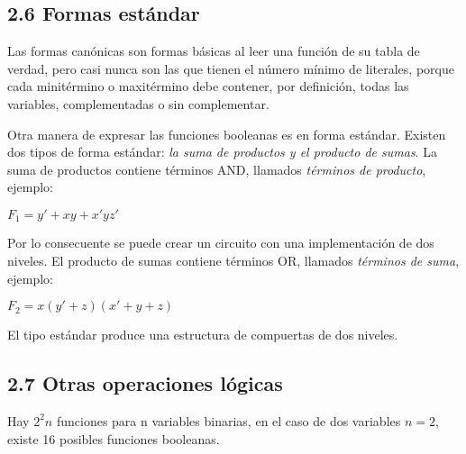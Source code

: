 \subsection*{2.6 Formas est\'{a}ndar}
Las formas can\'{o}nicas son formas b\'{a}sicas al leer una funci\'{o}n de su tabla
de verdad, pero casi nunca son las que tienen el n\'{u}mero m\'{i}nimo de literales,
porque cada minit\'{e}rmino o maxit\'{e}rmino debe contener, por definici\'{o}n, todas las
variables, complementadas o sin complementar.

Otra manera de expresar las funciones booleanas es en forma est\'{a}ndar.
Existen dos tipos de forma est\'{a}ndar:
\textit{la suma de productos y el producto de sumas}. La suma de productos contiene
t\'{e}rminos AND, llamados \textit{t\'{e}rminos de producto}, ejemplo:
\begin{center}
    $F_1 = y' + xy + x'yz'$
\end{center}
Por lo consecuente se puede crear un circuito con una implementaci\'{o}n de dos niveles.
El producto de sumas contiene t\'{e}rminos OR, llamados \textit{t\'{e}rminos de suma}, ejemplo:
\begin{center}
    $F_2 = x(y' +  z)(x' + y + z)$
\end{center}
El tipo est\'{a}ndar produce una estructura de compuertas de dos niveles.

\subsection*{2.7 Otras operaciones l\'{o}gicas}
Hay $2^2n$ funciones para n variables binarias, en el caso de dos variables $n = 2$,
existe 16 posibles funciones booleanas.


